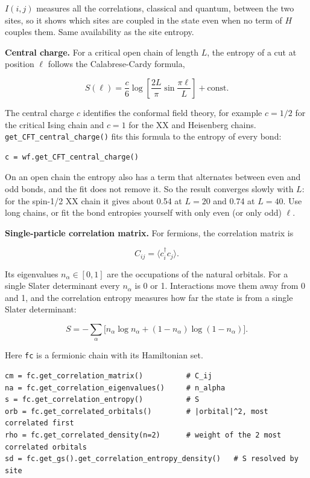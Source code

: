 \documentclass[11pt]{article}
\begin{document}
\(I(i,j)\) measures all the correlations, classical and quantum, between the
two sites, so it shows which sites are coupled in the state even when no
term of \(H\) couples them. Same availability as the site entropy.

\textbf{Central charge.} For a critical open chain of length \(L\), the entropy
of a cut at position \(\ell\) follows the Calabrese-Cardy formula,

\[S(\ell)=\frac c6\log\!\left[\frac{2L}{\pi}\sin\frac{\pi\ell}{L}\right]+\text{const}.\]

The central charge \(c\) identifies the conformal field theory, for example
\(c=1/2\) for the critical Ising chain and \(c=1\) for the XX and Heisenberg
chains. \texttt{get\_\allowbreak{}CFT\_\allowbreak{}central\_\allowbreak{}charge()} fits this formula to the entropy of
every bond:

\begin{lstlisting}
c = wf.get_CFT_central_charge()
\end{lstlisting}

On an open chain the entropy also has a term that alternates between even
and odd bonds, and the fit does not remove it. So the result converges
slowly with \(L\): for the spin-1/2 XX chain it gives about 0.54 at \(L=20\)
and 0.74 at \(L=40\). Use long chains, or fit the bond entropies yourself
with only even (or only odd) \(\ell\).

\textbf{Single-particle correlation matrix.} For fermions, the correlation
matrix is

\[C_{ij}=\langle c_i^\dagger c_j\rangle .\]

Its eigenvalues \(n_\alpha\in[0,1]\) are the occupations of the natural
orbitals. For a single Slater determinant every \(n_\alpha\) is 0 or 1.
Interactions move them away from 0 and 1, and the correlation entropy
measures how far the state is from a single Slater determinant:

\[S=-\sum_\alpha\Big[n_\alpha\log n_\alpha+(1-n_\alpha)\log(1-n_\alpha)\Big].\]

Here \texttt{fc} is a fermionic chain with its Hamiltonian set.

\begin{lstlisting}
cm = fc.get_correlation_matrix()          # C_ij
na = fc.get_correlation_eigenvalues()     # n_alpha
s = fc.get_correlation_entropy()          # S
orb = fc.get_correlated_orbitals()        # |orbital|^2, most correlated first
rho = fc.get_correlated_density(n=2)      # weight of the 2 most correlated orbitals
sd = fc.get_gs().get_correlation_entropy_density()   # S resolved by site
\end{lstlisting}
\end{document}
